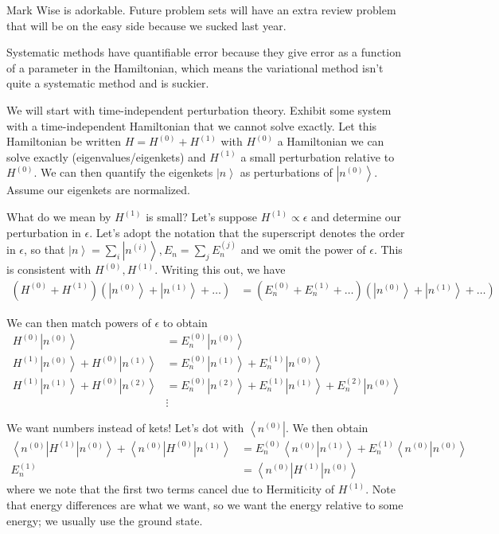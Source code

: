 \documentclass[10pt]{report}
\newcommand{\bra}[1]{\left<#1\right|}
\newcommand{\ket}[1]{\left|#1\right>}
\newcommand{\dotp}[2]{\left<#1\left.\right|#2\right>}
\begin{document}
Mark Wise is adorkable. Future problem sets will have an extra review problem that will be on the easy side because we sucked last year.

Systematic methods have quantifiable error because they give error as a function of a parameter in the Hamiltonian, which means the variational method isn't quite a systematic method and is suckier.

We will start with time-independent perturbation theory. Exhibit some system with a time-independent Hamiltonian that we cannot solve exactly. Let this Hamiltonian be written $H = H^{(0)} + H^{(1)}$ with $H^{(0)}$ a Hamiltonian we can solve exactly (eigenvalues/eigenkets) and $H^{(1)}$ a small perturbation relative to $H^{(0)}$. We can then quantify the eigenkets $\ket{n}$ as perturbations of $\ket{n^{(0)}}$. Assume our eigenkets are normalized.

What do we mean by $H^{(1)}$ is small? Let's suppose $H^{(1)} \propto\epsilon$ and determine our perturbation in $\epsilon$. Let's adopt the notation that the superscript denotes the order in $\epsilon$, so that $\ket{n} = \sum_i \ket{n^{(i)}}, E_n = \sum_j E_n^{(j)}$ and we omit the power of $\epsilon$. This is consistent with $H^{(0)}, H^{(1)}$. Writing this out, we have
\begin{align}
    \left( H^{(0)} + H^{(1)} \right)\left( \ket{n^{(0)}} + \ket{n^{(1)}} + \dots \right) &= \left( E_n^{(0)} + E^{(1)}_n +\dots \right)\left( \ket{n^{(0)}} + \ket{n^{(1)}} + \dots \right)
\end{align}

We can then match powers of $\epsilon$ to obtain
\begin{align}
    H^{(0)}\ket{n^{(0)}} &= E_n^{(0)}\ket{n^{(0)}}\\
    H^{(1)}\ket{n^{(0)}} + H^{(0)}\ket{n^{(1)}} &= E_n^{(0)}\ket{n^{(1)}}+ E_n^{(1)}\ket{n^{(0)}}\\
    H^{(1)}\ket{n^{(1)}} + H^{(0)}\ket{n^{(2)}} &= E_n^{(0)}\ket{n^{(2)}}+ E_n^{(1)}\ket{n^{(1)}} + E_n^{(2)}\ket{n^{(0)}}\\
    \label{1.6.pertExp}
    &\vdots
\end{align}

We want numbers instead of kets! Let's dot with $\bra{n^{(0)}}$. We then obtain
\begin{align}
    \bra{n^{(0)}}H^{(1)}\ket{n^{(0)}} + \bra{n^{(0)}}H^{(0)}\ket{n^{(1)}} &= E_n^{(0)}\dotp{n^{(0)}}{n^{(1)}}+ E_n^{(1)}\dotp{n^{(0)}}{n^{(0)}}\\
    E_n^{(1)} &= \bra{n^{(0)}}H^{(1)}\ket{n^{(0)}}
    \label{1.6.energy}
\end{align}
where we note that the first two terms cancel due to Hermiticity of $H^{(1)}$. Note that energy differences are what we want, so we want the energy relative to some energy; we usually use the ground state.
\end{document}
